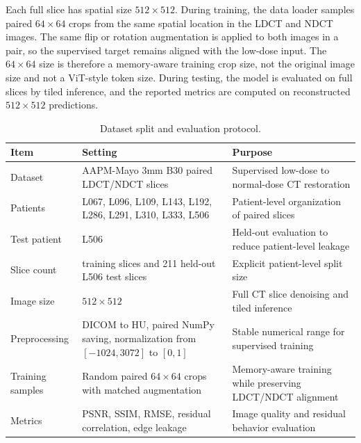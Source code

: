 Each full slice has spatial size \(512 \times 512\). During training, the data loader samples paired \(64 \times 64\) crops from the same spatial location in the LDCT and NDCT images. The same flip or rotation augmentation is applied to both images in a pair, so the supervised target remains aligned with the low-dose input. The \(64 \times 64\) size is therefore a memory-aware training crop size, not the original image size and not a ViT-style token size. During testing, the model is evaluated on full slices by tiled inference, and the reported metrics are computed on reconstructed \(512 \times 512\) predictions.

\begin{table}[!htbp]
    \centering
    \caption{Dataset split and evaluation protocol.}
    \renewcommand{\arraystretch}{1.35}
    \begin{tabular*}{\textwidth}{>{\raggedright\arraybackslash}p{}|>{\raggedright\arraybackslash}p{}|>{\raggedright\arraybackslash}p{}}
        \hline
        Item & Setting & Purpose \\
        \hline
        Dataset & AAPM-Mayo 3mm B30 paired LDCT/NDCT slices & Supervised low-dose to normal-dose CT restoration \\
        \hline
        Patients & L067, L096, L109, L143, L192, L286, L291, L310, L333, L506 & Patient-level organization of paired slices \\
        \hline
        Test patient & L506 & Held-out evaluation to reduce patient-level leakage \\
        \hline
        Slice count & 2167 training slices and 211 held-out L506 test slices & Explicit patient-level split size \\
        \hline
        Image size & \(512 \times 512\) & Full CT slice denoising and tiled inference \\
        \hline
        Preprocessing & DICOM to HU, paired NumPy saving, normalization from \([-1024,3072]\) to \([0,1]\) & Stable numerical range for supervised training \\
        \hline
        Training samples & Random paired \(64 \times 64\) crops with matched augmentation & Memory-aware training while preserving LDCT/NDCT alignment \\
        \hline
        Metrics & PSNR, SSIM, RMSE, residual correlation, edge leakage & Image quality and residual behavior evaluation \\
        \hline
    \end{tabular*}
    \label{tab:dataset_split}
\end{table}


